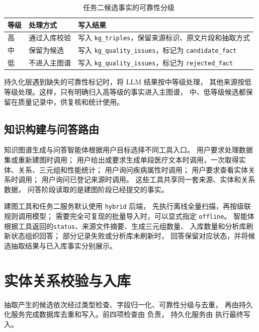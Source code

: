 \begin{table}[H]
\centering
\caption{任务二候选事实的可靠性分级}
\label{tab:reliability-tiers}
\begin{tabularx}{0.82\textwidth}{L{2.6cm}L{3.4cm}Y}
\toprule
\textbf{等级} & \textbf{处理方式} & \textbf{写入结果} \\
\midrule
高 & 通过入库校验 & 写入 \texttt{kg\_triples}，保留来源标识、原文片段和抽取方式 \\
中 & 保留为候选 & 写入 \texttt{kg\_quality\_issues}，标记为 \texttt{candidate\_fact} \\
低 & 不进入主图谱 & 写入 \texttt{kg\_quality\_issues}，标记为 \texttt{rejected\_fact} \\
\bottomrule
\end{tabularx}
\end{table}

持久化层遇到缺失的可靠性标记时，将 LLM 结果按中等级处理，
其他来源按低等级处理。这样，只有明确归入高等级的事实进入主图谱，
中、低等级候选都保留在质量记录中，供复核和统计使用。

\subsection{知识构建与问答路由}

知识图谱生成与问答智能体根据用户目标选择不同工具入口。
用户要求处理数据集或重新建图时调用；
用户给出或要求生成单段医疗文本时调用，一次取得实体、关系、三元组和性能统计；
用户询问疾病属性时调用；
用户要求查看实体关系时调用；
用户询问已登记来源时调用。
这些工具共享同一套来源、实体和关系数据，
问答阶段读取的是建图阶段已经提交的事实。

建图工具和任务二服务默认使用 \texttt{hybrid} 后端，
先执行离线全量扫描，再按级联规则调用模型；
需要完全可复现的批量导入时，可以显式指定 \texttt{offline}。
智能体根据工具返回的\texttt{status}、来源文件摘要、生成三元组数量、
入库数量和分析库刷新状态组织回答；
部分记录失败或分析库未刷新时，
回答保留对应状态，并将候选抽取结果与已入库事实分别展示。

\section{实体关系校验与入库}

抽取产生的候选依次经过类型检查、字段归一化、可靠性分级与去重，
再由持久化服务完成数据库去重和写入。前四项检查由
 负责，
持久化服务由  执行最终写入。

